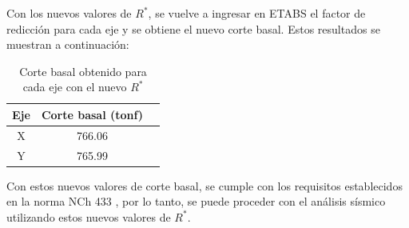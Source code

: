 Con los nuevos valores de $R^*$, se vuelve a ingresar en ETABS el factor de redicción para cada eje y se obtiene el nuevo corte basal. Estos resultados se muestran a continuación:
\begin{table}[H]
    \centering
    \begin{tabular}{ccc}
        Eje & Corte basal (tonf) \\
        \hline
        X & 766.06 \\
        Y & 765.99 \\
    \end{tabular}
    \caption{Corte basal obtenido para cada eje con el nuevo $R^*$}
    \label{tab:corte_basal_nuevo}
\end{table}
 
Con estos nuevos valores de corte basal, se cumple con los requisitos establecidos en la norma NCh 433 \cite{NCh433:1996}, por lo tanto, se puede proceder con el análisis sísmico utilizando estos nuevos valores de $R^*$.